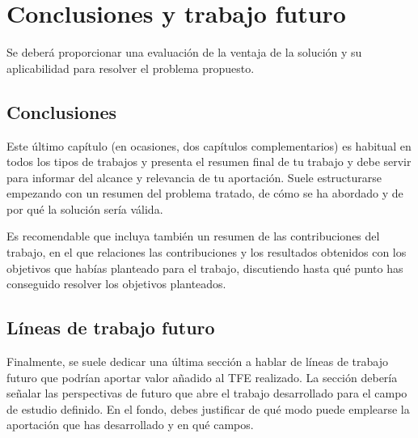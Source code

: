 \chapter{Conclusiones y trabajo futuro}

Se deberá proporcionar una evaluación de la ventaja de la solución y su aplicabilidad para resolver el problema propuesto.

\section{Conclusiones}

Este último capítulo (en ocasiones, dos capítulos complementarios) es habitual en todos los tipos de trabajos y presenta el resumen final de tu trabajo y debe servir para informar del alcance y relevancia de tu aportación.
Suele estructurarse empezando con un resumen del problema tratado, de cómo se ha abordado y de por qué la solución sería válida.

Es recomendable que incluya también un resumen de las contribuciones del trabajo, en el que relaciones las contribuciones y los resultados obtenidos con los objetivos que habías planteado para el trabajo, discutiendo hasta qué punto has conseguido resolver los objetivos planteados.

\section{Líneas de trabajo futuro}

Finalmente, se suele dedicar una última sección a hablar de líneas de trabajo futuro que podrían aportar valor añadido al TFE realizado. La sección debería señalar las perspectivas de futuro que abre el trabajo desarrollado para el campo de estudio definido. En el fondo, debes justificar de qué modo puede emplearse la aportación que has desarrollado y en qué campos.